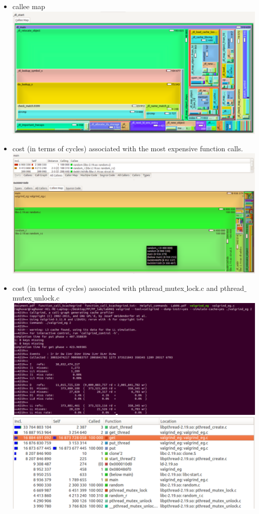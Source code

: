 \documentclass{sem5}
\begin{document}
\begin{enumerate}
\begin{itemize}
\item callee map\\
\includegraphics[scale=.6]{pic1.png}
\item cost (in terms of cycles) associated with the most expensive function calls.\\
\includegraphics[scale=.6]{pic2.png}
\item cost (in terms of cycles) associated with pthread$\_$mutex$\_$lock.c and pthread$\_$mutex$\_$unlock.c\\
\includegraphics[scale=.6]{pic3.png}
\includegraphics[scale=.6]{pic4.png}

\end{itemize}
\end{enumerate}
\end{document}
